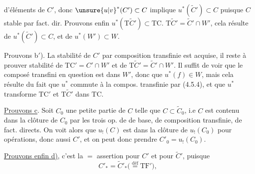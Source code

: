 
d'éléments de $C'$, donc $\unsure{u|v}^*(C')\subset C$ implique $u^*(\widetilde C')\subset C$ puisque $C$ stable par fact. dir. Prouvons enfin $u^*(\mathrm{T}\widetilde C')\subset\mathrm{TC}$.  $\mathrm{T}\widetilde C'=\widetilde C'\cap W'$, cela résulte de $u^*(\widetilde C')\subset C$, et de $u^*(W')\subset W$.

Prouvons b$'$). La stabilité de $C'$ par composition transfinie est acquise, il reste à prouver  stabilité de $\mathrm{TC}'=C'\cap W'$ et de $\mathrm{T}\widetilde C'=\widetilde C'\cap W'$. Il suffit de voir que le composé transfini  en question est dans $W'$, donc que $u^*(f)\in W$, mais cela résulte du fait que $u^*$ commute à la compos. transfinie par (4.5.4), et que $u^*$ transforme $\mathrm{TC}'$ et $\mathrm{T}\widetilde C'$ dans $\mathrm{TC}$.

\uline{Prouvons c}. Soit $C_0$ une petite partie de $C$ telle que $C\subset\widetilde C_0$, i.e $C$ est contenu dans la clôture de $C_0$ par les trois op. de  de base, de composition transfinie, de fact. directs. On voit alors que $u_!(C)$ est dans la clôture de $u_!(C_0)$ pour  opérations, donc aussi $C'$, et on peut donc prendre $C'_0=u_!(C_0)$.

\uline{Prouvons enfin d)}, c'est la $=$ assertion pour $C'$ et pour $\widetilde C'$, puisque
\[
C'_*= \widetilde C'_* \bigl(\overset{\mathrm{déf}}{=}\mathrm{TF}'\bigr),
\]
